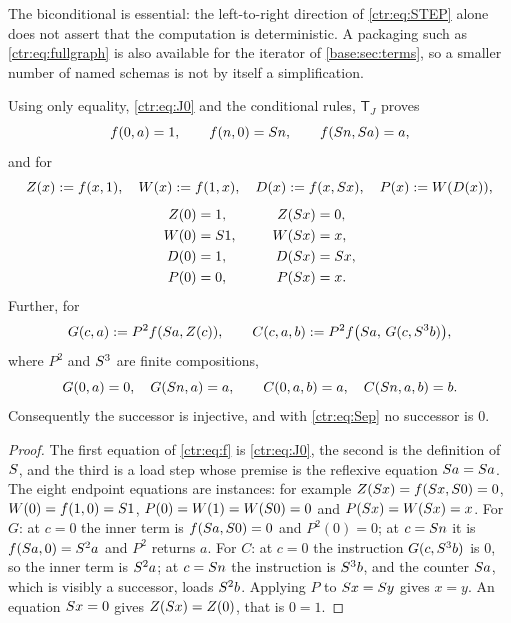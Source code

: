 The biconditional is essential: the left-to-right direction of \eqref{ctr:eq:STEP} alone
does not assert that the computation is deterministic. A packaging such as
\eqref{ctr:eq:fullgraph} is also available for the iterator of \cref{base:sec:terms}, so a
smaller number of named schemas is not by itself a simplification.

\begin{lemma}\label{ctr:lem:regboot}
Using only equality, \eqref{ctr:eq:J0} and the conditional rules, $\mathsf T_J$ proves
\begin{equation}\label{ctr:eq:f}
 f(0,a)=1,\qquad f(n,0)=S n,\qquad f(S n,S a)=a,
\end{equation}
and for
\[
 Z(x)\mathrel{:=} f(x,1),\quad W(x)\mathrel{:=} f(1,x),\quad D(x)\mathrel{:=} f(x,S x),\quad
 P(x)\mathrel{:=} W(D(x)),
\]
\begin{alignat*}{3}
 Z(0)&=1, &\qquad Z(S x)&=0,\\
 W(0)&=S 1, & W(S x)&=x,\\
 D(0)&=1, & D(S x)&=S x,\\
 P(0)&=0, & P(S x)&=x.
\end{alignat*}
Further, for
\[
 G(c,a)\mathrel{:=} P^2 f(S a,Z(c)),\qquad
 C(c,a,b)\mathrel{:=} P^2 f\bigl(S a,\,G(c,S^3 b)\bigr),
\]
where $P^2$ and $S^3$ are finite compositions,
\begin{equation}\label{ctr:eq:regsel}
 G(0,a)=0,\quad G(S n,a)=a,\qquad C(0,a,b)=a,\quad C(S n,a,b)=b .
\end{equation}
Consequently the successor is injective, and with \eqref{ctr:eq:Sep} no successor is $0$.
\end{lemma}
\begin{proof}
The first equation of \eqref{ctr:eq:f} is \eqref{ctr:eq:J0}, the second is the definition
of $S$, and the third is a load step whose premise is the reflexive equation
$S a=S a$. The eight endpoint equations are instances: for example
$Z(S x)=f(S x,S 0)=0$, $W(0)=f(1,0)=S 1$, $P(0)=W(1)=W(S 0)=0$ and
$P(S x)=W(S x)=x$. For $G$: at $c=0$ the inner term is $f(S a,S 0)=0$ and
$P^2(0)=0$; at $c=S n$ it is $f(S a,0)=S^2 a$ and $P^2$ returns $a$. For $C$: at
$c=0$ the instruction $G(c,S^3 b)$ is $0$, so the inner term is $S^2 a$; at
$c=S n$ the instruction is $S^3 b$, and the counter $S a$, which is visibly a
successor, loads $S^2 b$. Applying $P$ to $S x=S y$ gives $x=y$. An equation
$S x=0$ gives $Z(S x)=Z(0)$, that is $0=1$.
\end{proof}

